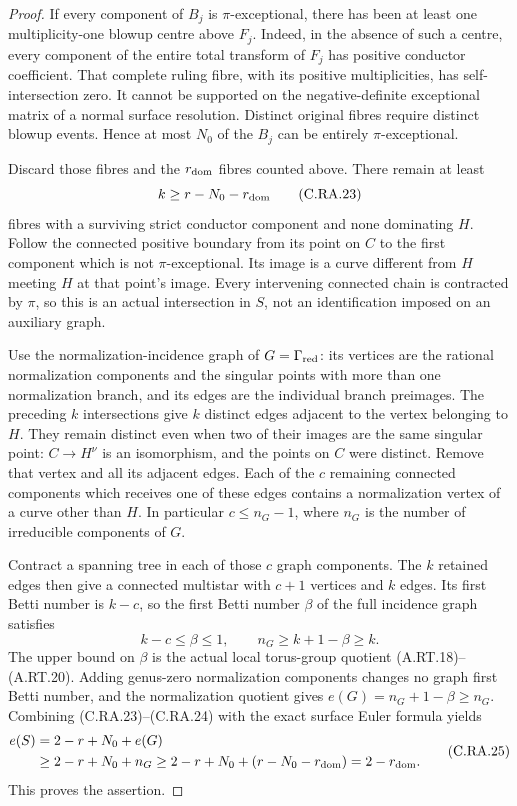 \begin{proof}
If every component of $B_j$ is $\pi$-exceptional, there
has been at least one multiplicity-one blowup centre
above $F_j$. Indeed, in the absence of such a centre,
every component of the entire total transform of $F_j$
has positive conductor coefficient. That complete
ruling fibre, with its positive multiplicities, has
self-intersection zero. It cannot be supported on the
negative-definite exceptional matrix of a normal surface
resolution. Distinct original fibres require distinct
blowup events. Hence at most $N_0$ of the $B_j$ can be
entirely $\pi$-exceptional.

Discard those fibres and the $r_{\rm dom}$ fibres counted
above. There remain at least
\[
                        k\ge r-N_0-r_{\rm dom}
\tag{C.RA.23}
\]
fibres with a surviving strict conductor component and
none dominating $H$. Follow the connected positive
boundary from its point on $C$ to the first component
which is not $\pi$-exceptional. Its image is a curve
different from $H$ meeting $H$ at that point's image.
Every intervening connected chain is contracted by
$\pi$, so this is an actual intersection in $S$, not
an identification imposed on an auxiliary graph.

Use the normalization-incidence graph of
$G=\Gamma_{\rm red}$: its vertices are the rational
normalization components and the singular points with
more than one normalization branch, and its edges are
the individual branch preimages. The preceding $k$
intersections give $k$ distinct edges adjacent to the
vertex belonging to $H$. They remain distinct even
when two of their images are the same singular point:
$C\to H^\nu$ is an isomorphism, and the points on $C$
were distinct. Remove that vertex and all its adjacent
edges. Each of the $c$ remaining connected components
which receives one of these edges contains a
normalization vertex of a curve other than $H$.
In particular $c\le n_G-1$, where $n_G$ is the number
of irreducible components of $G$.

Contract a spanning tree in each of those $c$ graph
components. The $k$ retained edges then give a connected
multistar with $c+1$ vertices and $k$ edges. Its first
Betti number is $k-c$, so the first Betti number
$\beta$ of the full incidence graph satisfies
\[
             k-c\le\beta\le1,
          \qquad n_G\ge k+1-\beta\ge k.
\tag{C.RA.24}
\]
The upper bound on $\beta$ is the actual local torus-group
quotient (A.RT.18)--(A.RT.20). Adding genus-zero
normalization components changes no graph first Betti
number, and the normalization quotient gives
$e(G)=n_G+1-\beta\ge n_G$. Combining (C.RA.23)--(C.RA.24)
with the exact surface Euler formula yields
\[
\begin{split}
 e(S)&=2-r+N_0+e(G)\\
     &\ge2-r+N_0+n_G
      \ge2-r+N_0+(r-N_0-r_{\rm dom})
       =2-r_{\rm dom}.
\end{split}
\tag{C.RA.25}
\]
This proves the assertion.
\end{proof}

